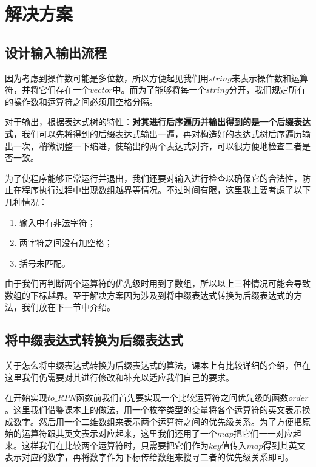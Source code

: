 \documentclass[UTF8]{ctexart}
\begin{document}
	
	\section{解决方案}
		\subsection{设计输入输出流程}\label{input and output}
		\indent 因为考虑到操作数可能是多位数，所以方便起见我们用$string$来表示操作数和运算符，并将它们存在一个$vector$中。而为了能够将每一个$string$分开，我们规定所有的操作数和运算符之间必须用空格分隔。
		
		\indent 对于输出，根据表达式树的特性：\textbf{对其进行后序遍历并输出得到的是一个后缀表达式}，我们可以先将得到的后缀表达式输出一遍，再对构造好的表达式树后序遍历输出一次，稍微调整一下缩进，使输出的两个表达式对齐，可以很方便地检查二者是否一致。
		
		\indent 为了使程序能够正常运行并退出，我们还要对输入进行检查以确保它的合法性，防止在程序执行过程中出现数组越界等情况。不过时间有限，这里我主要考虑了以下几种情况：
		\begin{enumerate}
			\item 输入中有非法字符；
			\item 两字符之间没有加空格；
			\item 括号未匹配。
		\end{enumerate}
		\indent 由于我们再判断两个运算符的优先级时用到了数组，所以以上三种情况可能会导致数组的下标越界。至于解决方案因为涉及到将中缀表达式转换为后缀表达式的方法，我们放在下一节中介绍。
	
		\subsection{将中缀表达式转换为后缀表达式}\label{fun to RPN}
		
		\indent 关于怎么将中缀表达式转换为后缀表达式的算法，课本\cite{data_structure}上有比较详细的介绍，但在这里我们仍需要对其进行修改和补充以适应我们自己的要求。
		
		\indent 在开始实现$to\_RPN$函数前我们首先要实现一个比较运算符之间优先级的函数$order$。这里我们借鉴课本\cite{data_structure}上的做法，用一个枚举类型的变量将各个运算符的英文表示换成数字。然后用一个二维数组来表示两个运算符之间的优先级关系。为了方便把原始的运算符跟其英文表示对应起来，这里我们还用了一个$map$把它们一一对应起来。这样我们在比较两个运算符时，只需要把它们作为$key$值传入$map$得到其英文表示对应的数字，再将数字作为下标传给数组来搜寻二者的优先级关系即可。
				
\end{document}
